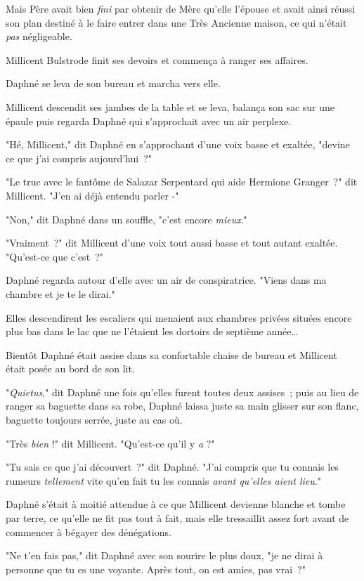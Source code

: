 Mais Père avait bien \emph{fini} par obtenir de Mère qu'elle l'épouse et avait ainsi réussi son plan destiné à le faire entrer dans une Très Ancienne maison, ce qui n'était \emph{pas} négligeable.

Millicent Bulstrode finit ses devoirs et commença à ranger ses affaires.

Daphné se leva de son bureau et marcha vers elle.

Millicent descendit ses jambes de la table et se leva, balança son sac sur une épaule puis regarda Daphné qui s'approchait avec un air perplexe.

"Hé, Millicent," dit Daphné en s'approchant d'une voix basse et exaltée, "devine ce que j'ai compris aujourd'hui~?"

"Le truc avec le fantôme de Salazar Serpentard qui aide Hermione Granger~?" dit Millicent. "J'en ai déjà entendu parler -"

"Non," dit Daphné dans un souffle, "c'est encore \emph{mieux}."

"Vraiment~?" dit Millicent d'une voix tout aussi basse et tout autant exaltée. "Qu'est-ce que c'est~?"

Daphné regarda autour d'elle avec un air de conspiratrice. "Viens dans ma chambre et je te le dirai."

Elles descendirent les escaliers qui menaient aux chambres privées situées encore plus bas dans le lac que ne l'étaient les dortoirs de septième année…

Bientôt Daphné était assise dans sa confortable chaise de bureau et Millicent était posée au bord de son lit.

"\emph{Quietus}," dit Daphné une fois qu'elles furent toutes deux assises~; puis au lieu de ranger sa baguette dans sa robe, Daphné laissa juste sa main glisser sur son flanc, baguette toujours serrée, juste au cas où.

"Très \emph{bien} !" dit Millicent. "Qu'est-ce qu'il y \emph{a} ?"

"Tu sais ce que j'ai découvert~?" dit Daphné. "J'ai compris que tu connais les rumeurs \emph{tellement} vite qu'en fait tu les connais \emph{avant qu'elles aient lieu}."

Daphné s'était à moitié attendue à ce que Millicent devienne blanche et tombe par terre, ce qu'elle ne fit pas tout à fait, mais elle tressaillit assez fort avant de commencer à bégayer des dénégations.

"Ne t'en fais pas," dit Daphné avec son sourire le plus doux, "je ne dirai à personne que tu es une voyante. Après tout, on est amies, pas vrai~?"

